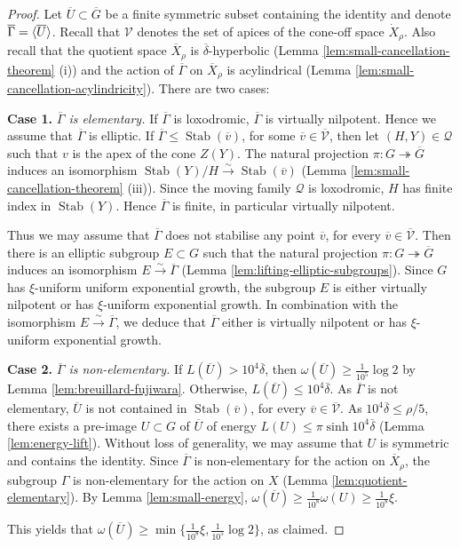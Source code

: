 \documentclass[leqno,a4paper,10pt]{amsart}
\theoremstyle{plain}
\theoremstyle{definition}
\theoremstyle{remark}
\newcommand{\q}[1]{\overline{#1}}
\newcommand{\stab}[1]{\operatorname{Stab}(#1)}
\renewcommand{\leq}{\leqslant}
\newcommand{\scrQ}{\mathscr{Q}}
\newcommand{\scrV}{\mathscr{V}}
\let\le\leqslant
\let\ge\geqslant
\let\leq\leqslant
\newcommand{\group}[1]{
	\mathchoice%
	{\left\langle #1\right\rangle}%
	{\langle #1\rangle}%
	{\langle #1\rangle}%
	{\langle #1\rangle}%
}
\newcommand{\onto}{\twoheadrightarrow}
\begin{document}
\begin{proof}
		Let $\q U\subset \q G$ be a finite symmetric subset containing the identity and denote $\q \Gamma=\group{\q U}$. Recall that $\scrV$ denotes the set of apices of the cone-off space $\dot{X}_{\rho}$. Also recall that the quotient space $\q {X}_{\rho}$ is $\q\delta$-hyperbolic (Lemma \ref{lem:small-cancellation-theorem} (i)) and the action of $\q \Gamma$ on $\q {X}_{\rho}$ is acylindrical (Lemma \ref{lem:small-cancellation-acylindricity}). There are two cases:
	 
	\textbf{Case 1.} \emph{$\q \Gamma$ is elementary.}
	If $\q \Gamma$ is loxodromic, $\q\Gamma$ is virtually nilpotent. Hence we assume that $\q\Gamma$ is elliptic. 
	If $\q\Gamma \leq \stab{\q v}$, for some $\q v\in \q {\scrV}$, then let $(H,Y)\in\scrQ$ such that $v$ is the apex of the cone $Z(Y)$. The natural projection $\pi\colon G\onto \q G$ induces an isomorphism $\stab{Y}/H \xrightarrow{\sim} \stab{\q v}$ (Lemma \ref{lem:small-cancellation-theorem} (iii)). Since the moving family $\scrQ$ is loxodromic, $H$ has finite index in $\stab{Y}$. Hence $\q \Gamma$ is finite, in particular virtually nilpotent. 
	
	Thus we may assume that $\q\Gamma$ does not stabilise any point $\q v$, for every $\q v\in \q {\scrV}$. Then there is an elliptic subgroup $E\subset G$ such that the natural projection $\pi\colon G\onto \q G$ induces an isomorphism $E\xrightarrow{\sim} \q \Gamma$ (Lemma \ref{lem:lifting-elliptic-subgroups}). Since $G$ has $\xi$-uniform uniform exponential growth, the subgroup $E$ is either virtually nilpotent or has $\xi$-uniform exponential growth. In combination with the isomorphism $E\xrightarrow{\sim} \q \Gamma$, we deduce that $\q \Gamma$ either is virtually nilpotent or has $\xi$-uniform exponential growth.
	
	\textbf{Case 2.} \emph{$\q \Gamma$ is non-elementary.}
	 If  $L(\q U)>10^4\q\delta$, then  $\omega(\q U) \ge \frac{1}{10^5} \log 2$ by Lemma \ref{lem:breuillard-fujiwara}.
	Otherwise, $L(\q U)\le 10^4\q\delta$. As $\q \Gamma$ is not elementary, 		
		$\q U$ is not contained in $\stab{\q v}$, for every $\q v\in \q {\scrV}$. As $10^4\q\delta\le \rho/5$, there exists a pre-image $U\subset G$ of $\q U$ of energy $L(U) \leqslant \pi \sinh 10^4\q\delta$ (Lemma \ref{lem:energy-lift}). Without loss of generality, we may assume that $U$ is symmetric and contains the identity. Since $\q \Gamma$ is non-elementary for the action on $\q {X}_{\rho}$, the subgroup $\Gamma$ is non-elementary for the action on $X$ (Lemma \ref{lem:quotient-elementary}). By Lemma \ref{lem:small-energy}, $\omega(\q U)\ge \frac{1}{10^8}\omega(U)\ge \frac{1}{10^8} \xi$.  

This yields that $\omega(\q U) \geqslant \min \{\frac{1}{10^8} \xi,\frac{1}{10^5} \log 2\}$, as claimed.
			\end{proof}
\end{document}
